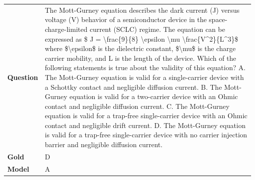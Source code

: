 \begin{longtable}{@{}l p{13cm}@{}}
  \textbf{Question}  & The Mott-Gurney equation describes the dark current (J) versus voltage (V) behavior of a semiconductor device in the space-charge-limited current (SCLC) regime. The equation can be expressed as \newline \$ J = \textbackslash{}frac\{9\}\{8\} \textbackslash{}epsilon \textbackslash{}mu \textbackslash{}frac\{V\textasciicircum{}2\}\{L\textasciicircum{}3\}\$ \newline where \$\textbackslash{}epsilon\$ is the dielectric constant, \$\textbackslash{}mu\$ is the charge carrier mobility, and L is the length of the device. Which of the following statements is true about the validity of this equation? \newline A. The Mott-Gurney equation is valid for a single-carrier device with a Schottky contact and negligible diffusion current. \newline B. The Mott-Gurney equation is valid for a two-carrier device with an Ohmic contact and negligible diffusion current. \newline C. The Mott-Gurney equation is valid for a trap-free single-carrier device with an Ohmic contact and negligible drift current. \newline D. The Mott-Gurney equation is valid for a trap-free single-carrier device with no carrier injection barrier and negligible diffusion current.   \\
  \textbf{Gold}      & D       \\
  \textbf{Model}     & A  \\

\end{longtable}

